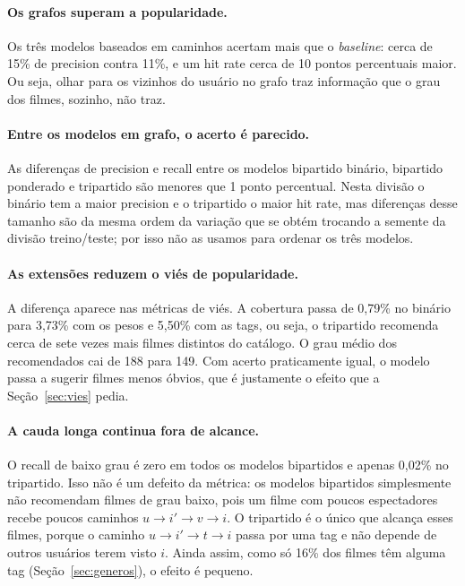 \documentclass[12pt,a4paper]{article}
\theoremstyle{definition}
\begin{document}
\paragraph{Os grafos superam a popularidade.}
Os três modelos baseados em caminhos acertam mais que o \emph{baseline}:
cerca de 15\% de precision contra 11\%, e um hit rate cerca de 10 pontos
percentuais maior. Ou seja, olhar para os vizinhos do usuário no grafo
traz informação que o grau dos filmes, sozinho, não traz.

\paragraph{Entre os modelos em grafo, o acerto é parecido.}
As diferenças de precision e recall entre os modelos bipartido binário,
bipartido ponderado e tripartido são menores que 1 ponto percentual. Nesta
divisão o binário tem a maior precision e o tripartido o maior hit rate,
mas diferenças desse tamanho são da mesma ordem da variação que se obtém
trocando a semente da divisão treino/teste; por isso não as usamos para
ordenar os três modelos.

\paragraph{As extensões reduzem o viés de popularidade.}
A diferença aparece nas métricas de viés. A cobertura passa de 0{,}79\%
no binário para 3{,}73\% com os pesos e 5{,}50\% com as tags, ou seja, o
tripartido recomenda cerca de sete vezes mais filmes distintos do
catálogo. O grau médio dos recomendados cai de 188 para 149. Com acerto
praticamente igual, o modelo passa a sugerir filmes menos óbvios, que é
justamente o efeito que a Seção~\ref{sec:vies} pedia.

\paragraph{A cauda longa continua fora de alcance.}
O recall de baixo grau é zero em todos os modelos bipartidos e apenas
0{,}02\% no tripartido. Isso não é um defeito da métrica: os modelos
bipartidos simplesmente não recomendam filmes de grau baixo, pois um
filme com poucos espectadores recebe poucos caminhos
$u \to i' \to v \to i$. O tripartido é o único que alcança esses filmes,
porque o caminho $u \to i' \to t \to i$ passa por uma tag e não depende
de outros usuários terem visto $i$. Ainda assim, como só 16\% dos filmes
têm alguma tag (Seção~\ref{sec:generos}), o efeito é pequeno.
\end{document}
